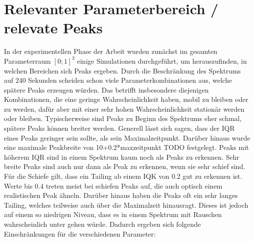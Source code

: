 \section{Relevanter Parameterbereich / relevate Peaks}
In der experimentellen Phase der Arbeit wurden zunächst im gesamten Parameterraum $[0;1]^3$ einige Simulationen durchgeführt, um herauszufinden, in welchen Bereichen sich Peaks ergeben. 
Durch die Beschränkung des Spektrums auf $240$ Sekunden scheiden schon viele Parameterkombinationen aus, welche spätere Peaks erzeugen würden. Das betrifft insbesondere diejenigen Kombinationen, die eine geringe Wahrscheinlichkeit haben, mobil zu bleiben oder zu werden, dafür aber mit einer sehr hohen Wahrscheinlichkeit stationär werden oder bleiben. 
Typischerweise sind Peaks zu Beginn des Spektrums eher schmal, spätere Peaks können breiter werden. Generell lässt sich sagen, dass der IQR eines Peaks geringer sein sollte, als sein Maximalzeitpunkt. Darüber hinaus wurde eine maximale Peakbreite von 10+0.2*maxzeitpunkt TODO festgelegt. Peaks mit höherem IQR sind in einem Spektrum kaum noch als Peaks zu erkennen.
Sehr breite Peaks sind auch nur dann als Peak zu erkennen, wenn sie sehr schief sind.
Für die Schiefe gilt, dass ein Tailing ab einem IQK von 0.2 gut zu erkennen ist. Werte bis 0.4 treten meist bei schiefen Peaks auf, die auch optisch einem realistischen Peak ähneln. Darüber hinaus haben die Peaks oft ein sehr langes Tailing, welches teilweise auch über die Maximalzeit hinausragt. Dieses ist jedoch auf einem so niedrigen Niveau, dass es in einem Spektrum mit Rauschen wahrscheinlich unter gehen würde.
Dadurch ergeben sich folgende Einschränkungen für die verschiedenen Parameter:
